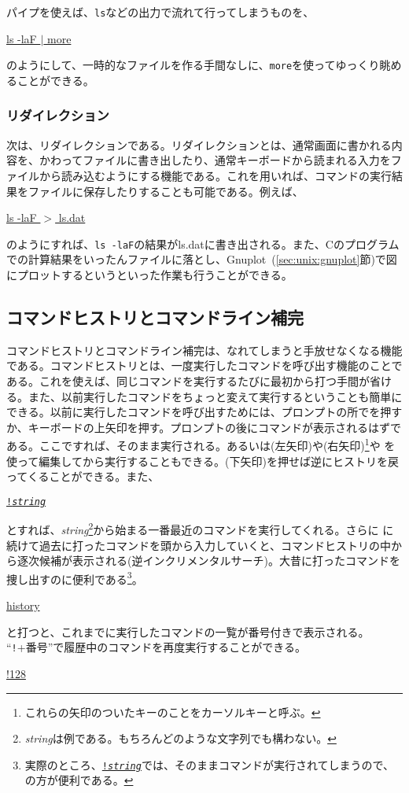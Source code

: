 パイプを使えば、\texttt{ls}などの出力で流れて行ってしまうものを、
\begin{commandline2}
    \prompt \underline{ls -laF \(|\) more}
\end{commandline2} \noindent
のようにして、一時的なファイルを作る手間なしに、\texttt{more}を使ってゆっくり眺めることができる。

\subsubsection*{リダイレクション}
次は、リダイレクションである。リダイレクションとは、通常画面に書かれる内容を、かわってファイルに書き出したり、通常キーボードから読まれる入力をファイルから読み込むようにする機能である。これを用いれば、コマンドの実行結果をファイルに保存したりすることも可能である。例えば、
\begin{commandline2}
    \prompt \underline{ls -laF \(>\) ls.dat}
\end{commandline2} \noindent
のようにすれば、\texttt{ls -laF}の結果がls.datに書き出される。また、Cのプログラムでの計算結果をいったんファイルに落とし、Gnuplot~(\ref{sec:unix:gnuplot}節)で図にプロットするというといった作業も行うことができる。

\subsection{コマンドヒストリとコマンドライン補完}

コマンドヒストリとコマンドライン補完は、なれてしまうと手放せなくなる機能である。コマンドヒストリとは、一度実行したコマンドを呼び出す機能のことである。これを使えば、同じコマンドを実行するたびに最初から打つ手間が省ける。また、以前実行したコマンドをちょっと変えて実行するということも簡単にできる。以前に実行したコマンドを呼び出すためには、プロンプトの所でを押すか、キーボードの上矢印を押す。プロンプトの後にコマンドが表示されるはずである。ここで\ret すれば、そのまま実行される。あるいは(左矢印)や(右矢印)\footnote{これらの矢印のついたキーのことをカーソルキーと呼ぶ。}や \BS を使って編集してから実行することもできる。(下矢印)を押せば逆にヒストリを戻ってくることができる。また、
\begin{commandline2}
    \prompt \underline{\texttt{!\textit{string}}}
\end{commandline2} \noindent
とすれば、\textit{string}\footnote{\textit{string}は例である。もちろんどのような文字列でも構わない。}から始まる一番最近のコマンドを実行してくれる。さらに に続けて過去に打ったコマンドを頭から入力していくと、コマンドヒストリの中から逐次候補が表示される(逆インクリメンタルサーチ)。大昔に打ったコマンドを捜し出すのに便利である\footnote{実際のところ、\underline{\texttt{!\textit{string}}}では、そのままコマンドが実行されてしまうので、の方が便利である。}。
\begin{commandline2}
    \prompt \underline{history}
\end{commandline2} \noindent
と打つと、これまでに実行したコマンドの一覧が番号付きで表示される。
``\texttt{!}+番号''で履歴中のコマンドを再度実行することができる。
\begin{commandline2}
    \prompt \underline{!128}
\end{commandline2} \noindent

